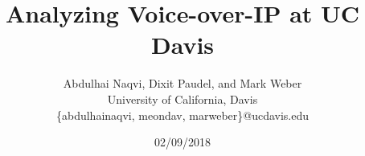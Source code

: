 \documentclass[letterpaper,twocolumn,10pt]{article}
\begin{document}
\title{ Analyzing Voice-over-IP at UC Davis}
\date{ 02/09/2018 }
\author{Abdulhai Naqvi, Dixit Paudel, and Mark Weber\\
University of California, Davis\\
\{abdulhainaqvi, meondav, marweber\}@ucdavis.edu}


\begin{titlepage}
	\maketitle
	
\end{titlepage}














\appendix



\end{document}
